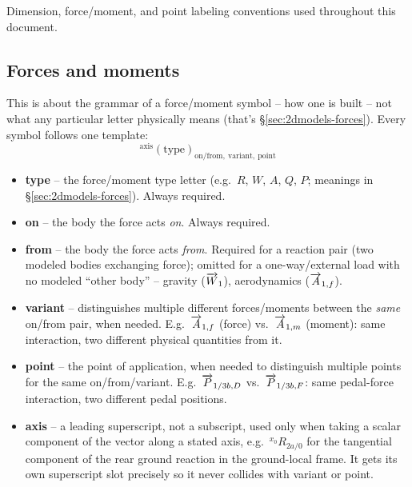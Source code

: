 Dimension, force/moment, and point labeling conventions used throughout this document.

\subsection{Forces and moments}
\label{app:notation-forces}
This is about the grammar of a force/moment symbol -- how one is built -- not what any particular letter physically means (that's \S\ref{sec:2dmodels-forces}). Every symbol follows one template:
\begin{equation}
    {}^{\text{axis}}(\text{type})_{\text{on}/\text{from},\ \text{variant},\ \text{point}}
\end{equation}

\begin{itemize}
    \item \textbf{type} -- the force/moment type letter (e.g.\ $R$, $W$, $A$, $Q$, $P$; meanings in \S\ref{sec:2dmodels-forces}). Always required.
    \item \textbf{on} -- the body the force acts \emph{on}. Always required.
    \item \textbf{from} -- the body the force acts \emph{from}. Required for a reaction pair (two modeled bodies exchanging force); omitted for a one-way/external load with no modeled ``other body'' -- gravity ($\overrightarrow{W}_1$), aerodynamics ($\overrightarrow{A}_{1,f}$).
    \item \textbf{variant} -- distinguishes multiple different forces/moments between the \emph{same} on/from pair, when needed. E.g.\ $\overrightarrow{A}_{1,f}$ (force) vs.\ $\overrightarrow{A}_{1,m}$ (moment): same interaction, two different physical quantities from it.
    \item \textbf{point} -- the point of application, when needed to distinguish multiple points for the same on/from/variant. E.g.\ $\overrightarrow{P}_{1/3b,D}$ vs.\ $\overrightarrow{P}_{1/3b,F}$: same pedal-force interaction, two different pedal positions.
    \item \textbf{axis} -- a leading superscript, not a subscript, used only when taking a scalar component of the vector along a stated axis, e.g.\ ${}^{x_0}R_{2a/0}$ for the tangential component of the rear ground reaction in the ground-local frame. It gets its own superscript slot precisely so it never collides with variant or point.
\end{itemize}

